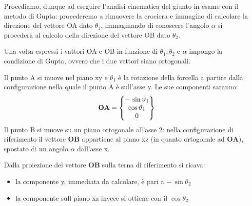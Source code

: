 Procediamo, dunque ad eseguire l'analisi cinematica del giunto in esame con il metodo di Gupta: procederemo a rimuovere la crociera e immagino di calcolare la direzione del vettore OA dato $\theta_1$, immaginando di conoscere l'angolo $\alpha$ si procederà al calcolo della direzione del vettore OB dato $\theta_2$.

Una volta espressi i vattori OA e OB in funzione di $\theta_1, \theta_2$ e $\alpha$ impongo la condizione di Gupta, ovvero che i due vettori siano ortogonali.

Il punto A si muove nel piano xy e $\theta_1$ è la rotazione della forcella a partire dalla configurazione nella quale il punto A è sull'asse y. Le sue componenti saranno:
\[\mathbf{OA} = \begin{Bmatrix}-\,\sin{\vartheta_1}\\\cos{\vartheta_1}\\0\end{Bmatrix}\]
 Il punto B si muove su un piano ortogonale all'asse 2: nella configurazione di riferimento il vettore $\mathbf{OB}$ appartiene al piano xz (in quanto ortogonale ad $\mathbf{OA}$), spostato di un angolo $\alpha$ dall'asse x.
 
Dalla proiezione del vettore $\mathbf{OB}$ sulla terna di riferimento si ricava:
\begin{itemize}
\item la componente y, immediata da calcolare, è pari a $-\,\sin{\theta_2}$
\item la componente sull piano xz invece si ottiene con il $\cos{\theta_2}$
\end{itemize} 

